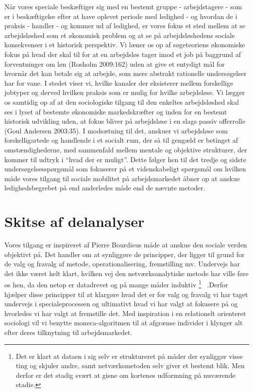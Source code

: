 Når vores speciale beskæftiger sig med en bestemt gruppe - arbejdstagere - som er i beskæftigelse efter at have oplevet periode med ledighed - og hvordan de i praksis - handler - og kommer ud af ledighed, er vores fokus et sted mellem at se arbejdsløshed som et økonomisk problem og at se på arbejdsløshedens sociale konsekvenser i et historisk perspektiv. Vi læner os op af søgeteoriens økonomiske fokus på hvad der skal til for at en arbejdsløs tager imod et job på baggrund af forventninger om løn (Rosholm 2009:162) uden at give et entydigt mål for hvornår det kan betale sig at arbejde, som mere abstrakt rationelle undersøgelser har for vane. I stedet viser vi, hvilke kanaler der eksisterer mellem forskellige jobtyper og derved hvilken praksis som er mulig for hvilke arbejdsløse. Vi lægger os samtidig op af at den sociologiske tilgang til den enkeltes arbejdsløshed skal ses i lyset af bestemte økonomiske markedskræfter og inden for en bestemt historisk udvikling uden, at fokus bliver på arbejdsløse i en slags passiv offerrolle (Goul Andersen 2003:35). I modsætning til det, anskuer vi arbejdsløse som forskelligartede og handlende i et socialt rum, der så til gengæld er betinget af omstændighederne, med sammenfald mellem mentale og objektive strukturer, der kommer til udtryk i “hvad der er muligt”.
Dette følger hen til det tredje og sidste undersøgelsesspørgsmål som fokuserer på et videnskabeligt spørgsmål om hvilken måde vores tilgang til sociale mobilitet på arbejdsmarkedet åbner op at anskue ledighedsbegrebet på end anderledes måde end de nævnte metoder.

\section{Skitse af delanalyser \label{}} 

Vores tilgang er inspireret af Pierre Bourdieus måde at anskue den sociale verden objektivt på. Det handler om at synliggøre de principper, der ligger til grund for de valg og fravalg af metode, operationalisering, fremstilling mv. Undervejs har det ikke været helt klart, hvilken vej den netværksanalytiske metode har ville føre os hen, da den netop er datadrevet og på mange måder induktiv%
%
\footnote{Det er klart at dataen i sig selv er struktureret på måder der synliggør visse ting og skjuler andre, samt netværksmetoden selv giver et bestemt blik. Men derfor er det stadig svært at gisne om kortenes udformning på nuværende stadie.}%
%
\ .Derfor hjælper disse principper til at klargøre hvad det er for valg og fravalg vi har taget undervejs i specialeprocessen og ultimativt hvad vi har valgt at fokusere på og hvorledes vi har valgt at fremstille det. Med inspiration i en relationelt orienteret sociologi vil vi benytte moneca-algoritmen til at afgrænse individer i klynger alt efter deres tilknytning til arbejdsmarkedet. 

